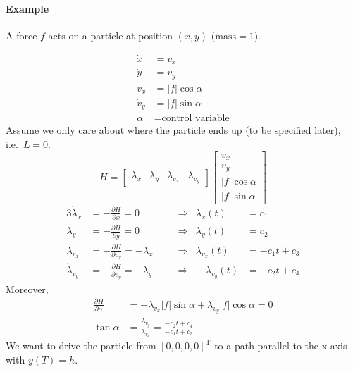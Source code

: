 \documentclass[letterpaper,12pt,titlepage]{report}
\newcommand{\trans}{^\text{T}}
\newcommand*\pder[2]{\frac{\partial #1}{\partial #2}}
\theoremstyle{plain}
\theoremstyle{definition}
\begin{document}
\paragraph{Example} \mbox{}

A force $f$ acts on a particle at position $(x,y)$ ($\text{mass}=1$).

\begin{center}
\end{center}
\begin{align}
  \dot x &= v_x \\
  \dot y &= v_y \\
  \dot v_x &= |f|\cos\alpha \\
  \dot v_y &= |f|\sin\alpha \\
  \alpha &= \text{control variable}
\end{align}
Assume we only care about where the particle ends up (to be specified later), i.e.\ $L=0$.
\[
  H = \begin{bmatrix}
    \lambda_x & \lambda_y & \lambda_{v_x} & \lambda_{v_y}
  \end{bmatrix}
  \begin{bmatrix}
    v_x \\ v_y \\ |f|\cos\alpha \\ |f|\sin\alpha
  \end{bmatrix}
\]
\begin{alignat}{3}
  \dot\lambda_x &= -\pder{H}{x} = 0 && \Longrightarrow & \lambda_x(t) &= c_1 \\
  \dot\lambda_y &= -\pder{H}{y} = 0 && \Longrightarrow & \lambda_y(t) &= c_2 \\
  \dot\lambda_{v_x} &= -\pder{H}{v_x} = -\lambda_x && \Longrightarrow & \lambda_{v_x}(t) &= -c_1 t + c_3 \\
  \dot\lambda_{v_y} &= -\pder{H}{v_y} = -\lambda_y \quad && \Longrightarrow & \quad \lambda_{v_y}(t) &= -c_2 t + c_4
\end{alignat}
Moreover,
\begin{align}
  \pder{H}{\alpha} &= -\lambda_{v_x} |f| \sin\alpha + \lambda_{v_y} |f| \cos\alpha = 0 \\
  \tan\alpha &= \frac{\lambda_{v_y}}{\lambda_{v_x}} = \frac{-c_2t+c_4}{-c_1t+c_3}
\end{align}
We want to drive the particle from $[0,0,0,0]\trans$ to a path parallel to the x-axis with $y(T)=h$.
\end{document}
